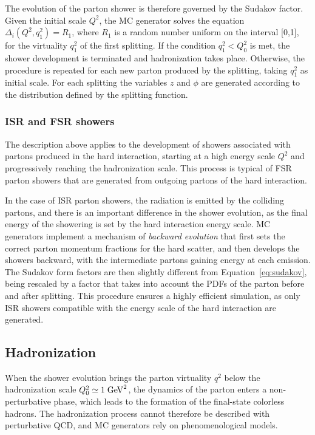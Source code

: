 The evolution of the parton shower is therefore governed by the
Sudakov factor. Given the initial scale $Q^2$, the MC generator solves
the equation $\Delta_i(Q^2, q_1^2)=R_1$, where $R_1$ is a random
number uniform on the interval [0,1], for the virtuality $q_1^2$ of
the first splitting. If the condition $q_1^2<Q_0^2$ is met, the shower
development is terminated and hadronization takes place. Otherwise,
the procedure is repeated for each new parton produced by the
splitting, taking $q_1^2$ as initial scale.
For each splitting the variables $z$ and $\phi$ are generated
according to the distribution defined by the splitting function.

\subsubsection{ISR and FSR showers}
\label{sec:isrfsr}

The description above applies to the development of showers
associated with partons produced in the hard interaction, starting at
a high energy scale $Q^2$ and progressively reaching the hadronization
scale. This process is typical of FSR parton showers that are
generated from outgoing partons of the hard interaction.

In the case of ISR parton showers, the radiation is emitted by the
colliding partons, and there is an important difference in the shower
evolution, as the final energy of the showering is set by the hard
interaction energy scale.
MC generators implement a mechanism of {\it backward evolution} that
first sets the correct parton momentum fractions for the hard scatter,
and then develops the showers backward, with the intermediate partons
gaining energy at each emission. The Sudakov form factors are then
slightly different from Equation~\ref{eq:sudakov}, being rescaled by a
factor that takes into account the PDFs of the parton before and after
splitting. This procedure ensures a highly efficient simulation, as
only ISR showers compatible with the energy scale of the hard
interaction are generated. 

\subsection{Hadronization}
\label{sec:hadronization}

When the shower evolution brings the parton virtuality $q^2$ below the
hadronization scale $Q_0^2\simeq1\; \mathrm{GeV}^2$, the dynamics of the parton
enters a non-perturbative phase, which leads to the formation of the
final-state colorless hadrons. The hadronization process cannot
therefore be described with perturbative QCD, and MC generators rely on
phenomenological models.

